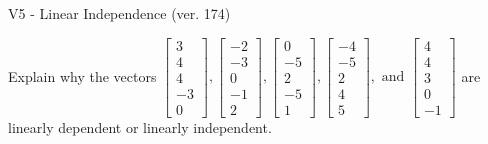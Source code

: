 \begin{exercise}
  \begin{exerciseTitle}V5 - Linear Independence (ver. 174)\end{exerciseTitle}
  \begin{exerciseStatement}
    Explain why the vectors \(\left[\begin{array}{r}
3 \\
4 \\
4 \\
-3 \\
0
\end{array}\right] , \left[\begin{array}{r}
-2 \\
-3 \\
0 \\
-1 \\
2
\end{array}\right] , \left[\begin{array}{r}
0 \\
-5 \\
2 \\
-5 \\
1
\end{array}\right] , \left[\begin{array}{r}
-4 \\
-5 \\
2 \\
4 \\
5
\end{array}\right] , \text{ and } \left[\begin{array}{r}
4 \\
4 \\
3 \\
0 \\
-1
\end{array}\right]\) are linearly dependent or linearly independent.	



\end{exerciseStatement}
\end{exercise}
